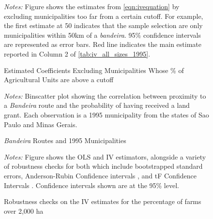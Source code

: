 \documentclass[11pt]{article}
\begin{document}
\begin{figure}[h!]
  \caption{Estimated Coefficients Excluding Municipalities Whose \% of Agricultural Units are above a cutoff \label{fig:iv_1995_bandeira_dist}}
  \begin{center}
  \end{center}
  \textit{Notes:} Figure shows the estimates from \autoref{eqn:ivequation} by excluding municipalities too far from a certain cutoff. For example, the first estimate at 50 indicates that the sample selection are only municipalities within 50km of a \textit{bandeira}. 95\% confidence intervals are represented as error bars. Red line indicates the main estimate reported in Column 2 of \autoref{tab:iv_all_sizes_1995}.
  \label{fig:iv_robustness_cutoffs}
\end{figure}

\clearpage

\begin{figure}[h!]
  \caption{\textit{Bandeira} Routes and 1995 Municipalities}
  \begin{center}
  \end{center}
  \textit{Notes:} Binscatter plot showing the correlation between proximity to a \textit{Bandeira} route and the probability of having received a land grant. Each observation is a 1995 municipality from the states of Sao Paulo and Minas Gerais.
  \label{fig:bandeira_dist_graph}
\end{figure}

\clearpage

\begin{figure}
  \caption{Robustness checks on the IV estimates for the percentage of farms over 2,000 ha}
  \begin{center}
  \end{center}
  \textit{Notes:} Figure shows the OLS and IV estimators, alongside a variety of robustness checks for both which include bootstrapped standard errors, Anderson-Rubin Confidence intervals \protect\parencite{Anderson1949-aa}, and tF Confidence Intervals \protect\parencite{Lee2022-jw}. Confidence intervals shown are at the 95\% level.
  \label{fig:ivdiag_1995}
\end{figure}
\end{document}
